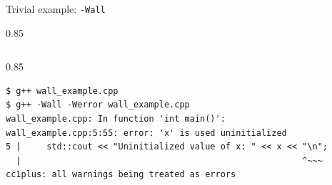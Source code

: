 \documentclass[aspectratio=1610]{beamer}
\newenvironment{centeredblock}[2][0.8\textwidth]
{ %
	\begin{center}
		\begin{varwidth}{#1} %
			\begin{block}{#2}
				\centering
			}
			{ %
			\end{block}
		\end{varwidth}
	\end{center}
}
\begin{document}
	\begin{frame}[fragile]{Trivial example: \texttt{-Wall}}
		\begin{centeredblock}[0.85 \textwidth]{}
			\inputminted{cpp}{../../02_programs/01_simplistic_introduction/wall_example.cpp}
		\end{centeredblock}
		
		\begin{centeredblock}[0.85 \textwidth]{}
			\begin{verbatim}
$ g++ wall_example.cpp
$ g++ -Wall -Werror wall_example.cpp
wall_example.cpp: In function 'int main()':
wall_example.cpp:5:55: error: 'x' is used uninitialized
5 |     std::cout << "Uninitialized value of x: " << x << "\n";
  |                                                       ^~~~
cc1plus: all warnings being treated as errors
			\end{verbatim}
		\end{centeredblock}
	
	\end{frame}
\end{document}
